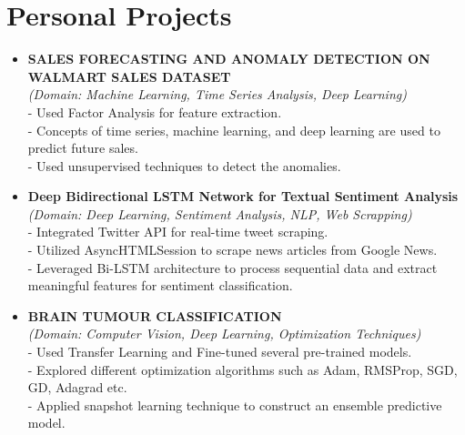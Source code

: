 \documentclass[11pt,a4paper,sans]{moderncv}
\begin{document}
\section{Personal Projects}
{\begin{itemize}[label=\textbullet]
\item {
\textbf{SALES FORECASTING AND ANOMALY DETECTION ON WALMART SALES DATASET} \href{https://github.com/U77w41/Forcasting-and-Anomaly-Detection}{}\\ 
\textit{(Domain: Machine Learning, Time Series Analysis, Deep Learning)} }
\\- Used Factor Analysis for feature extraction.
\\- Concepts of time series, machine learning, and deep learning are used to predict future sales.
\\- Used unsupervised techniques to detect the anomalies.
\end{itemize}}
%
{\begin{itemize}[label=\textbullet]
\item {
\textbf{Deep Bidirectional LSTM Network for Textual Sentiment Analysis} \href{https://github.com/U77w41/Deep-Bidirectional-LSTM-Network-for-Textual-Sentiment-Analysis}{}\\ 
\textit{(Domain: Deep Learning, Sentiment Analysis, NLP, Web Scrapping)} }
\\- Integrated Twitter API for real-time tweet scraping.
\\- Utilized AsyncHTMLSession to scrape news articles from Google News.
\\- Leveraged Bi-LSTM architecture to process sequential data and extract meaningful features for sentiment classification.
\end{itemize}}
%
{\begin{itemize}[label=\textbullet]
\item {
\textbf{BRAIN TUMOUR CLASSIFICATION} \href{https://github.com/U77w41/Brain-Tumour-Classificaion}{}\\ 
\textit{(Domain: Computer Vision, Deep Learning, Optimization Techniques)} }
\\- Used Transfer Learning and Fine-tuned several pre-trained models.
\\- Explored different optimization algorithms such as Adam, RMSProp, SGD, GD, Adagrad etc.
\\- Applied snapshot learning technique to construct an ensemble predictive model.
\end{itemize}}
\end{document}
